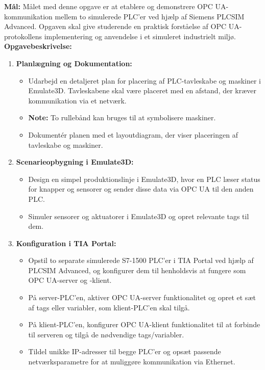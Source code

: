 \textbf{Mål:} Målet med denne opgave er at etablere og demonstrere OPC UA-kommunikation mellem to simulerede PLC'er ved hjælp af Siemens PLCSIM Advanced. Opgaven skal give studerende en praktisk forståelse af OPC UA-protokollens implementering og anvendelse i et simuleret industrielt miljø.
\newline\newline
\noindent\textbf{Opgavebeskrivelse:}
\begin{enumerate}
	\item \textbf{Planlægning og Dokumentation:}
	\begin{itemize}
		\item Udarbejd en detaljeret plan for placering af PLC-tavleskabe og maskiner i Emulate3D. Tavleskabene skal være placeret med en afstand, der kræver kommunikation via et netværk.
		\item \textbf{Note:} To rullebånd kan bruges til at symbolisere maskiner.
		\item Dokumentér planen med et layoutdiagram, der viser placeringen af tavleskabe og maskiner.
	\end{itemize}
	
	\item \textbf{Scenarieopbygning i Emulate3D:}
	\begin{itemize}
		\item Design en simpel produktionslinje i Emulate3D, hvor en PLC læser status for knapper og sensorer og sender disse data via OPC UA til den anden PLC.
		\item Simuler sensorer og aktuatorer i Emulate3D og opret relevante tags til dem.
	\end{itemize}
	
	\item \textbf{Konfiguration i TIA Portal:}
	\begin{itemize}
		\item Opstil to separate simulerede S7-1500 PLC'er i TIA Portal ved hjælp af PLCSIM Advanced, og konfigurer dem til henholdsvis at fungere som OPC UA-server og -klient.
		\item På server-PLC'en, aktiver OPC UA-server funktionalitet og opret et sæt af tags eller variabler, som klient-PLC'en skal tilgå.
		\item På klient-PLC'en, konfigurer OPC UA-klient funktionalitet til at forbinde til serveren og tilgå de nødvendige tags/variabler.
		\item Tildel unikke IP-adresser til begge PLC'er og opsæt passende netværksparametre for at muliggøre kommunikation via Ethernet.
	\end{itemize}
	

\end{enumerate}
